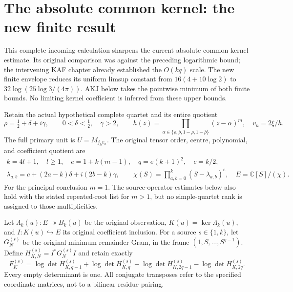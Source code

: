 \documentclass[11pt,a4paper]{article}
\begin{document}


\clearpage
\section{The absolute common kernel: the new finite result}
\label{sec:AKS}

This complete incoming calculation sharpens the current absolute common
kernel estimate. Its original comparison was against the preceding
logarithmic bound; the intervening KAF chapter already established
the $O(kq)$ scale. The new finite envelope reduces its uniform limsup
constant from $16(4+10\log2)$ to $32\log(25\log3/(4\pi))$.
AKJ below takes the pointwise minimum of both finite bounds. No
limiting kernel coefficient is inferred from these upper bounds.

Retain the actual hypothetical complete quartet and its entire quotient
\[
 \rho=\tfrac12+\delta+i\gamma,\qquad 0<\delta<\tfrac12,\quad \gamma>2,
 \qquad h(z)=\prod_{\alpha\in\{\rho,\bar\rho,1-\rho,1-\bar\rho\}}
 (z-\alpha)^m,\quad v_h=2\xi/h.
\]
The full primary unit is $U=M_{j_hv_h}$. The original tensor order, centre,
polynomial, and coefficient quotient are
\[
\begin{gathered}
 k=4l+1,\quad l\ge1,\quad e=1+k(m-1),\quad q=e(k+1)^2,\quad c=k/2,\\
 \lambda_{a,b}=c+(2a-k)\delta+i(2b-k)\gamma,\qquad
 \chi(S)=\prod_{a,b=0}^k(S-\lambda_{a,b})^e,
 \quad E=\mathbb C[S]/(\chi).
\end{gathered}\tag{AKS1}
\]
For the principal conclusion $m=1$. The source-operator estimates below
also hold with the stated repeated-root list for $m>1$, but no simple-quartet
rank is assigned to those multiplicities.

Let $\Lambda_k(u):E\twoheadrightarrow B_k(u)$ be the original observation,
$K(u)=\ker\Lambda_k(u)$, and $I:K(u)\hookrightarrow E$ its original
coefficient inclusion. For a source $s\in\{1,k\}$, let $G_N^{(s)}$ be the
original minimum-remainder Gram, in the frame $(1,S,\ldots,S^{q-1})$.
Define $H_{K,N}^{(s)}=I^*G_N^{(s)}I$ and retain exactly
\[
 F_K^{(s)}=
 \log\det H_{K,q-1}^{(s)}+\log\det H_{K,q}^{(s)}
 -\log\det H_{K,2q-1}^{(s)}-\log\det H_{K,2q}^{(s)}.
 \tag{AKS2}
\]
Every empty determinant is one. All conjugate transposes refer to the
specified coordinate matrices, not to a bilinear residue pairing.
\end{document}
